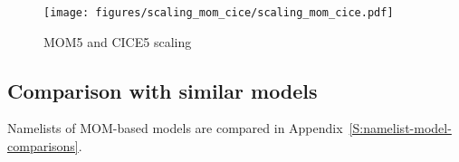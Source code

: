 \documentclass[11pt, a4paper]{article}
\begin{document}
\begin{figure}[htp]
\begin{center}
\texttt{[image: figures/scaling\_mom\_cice/scaling\_mom\_cice.pdf]}
\end{center}
\caption{MOM5 and CICE5 scaling}
\label{F:scalingmomcice}
\end{figure}


\subsection{Comparison with similar models}

\citet{IovinoMasinaStortoCipolloneStepanov2016a}

Namelists of MOM-based models are compared in Appendix~\ref{S:namelist-model-comparisons}.
\end{document}
